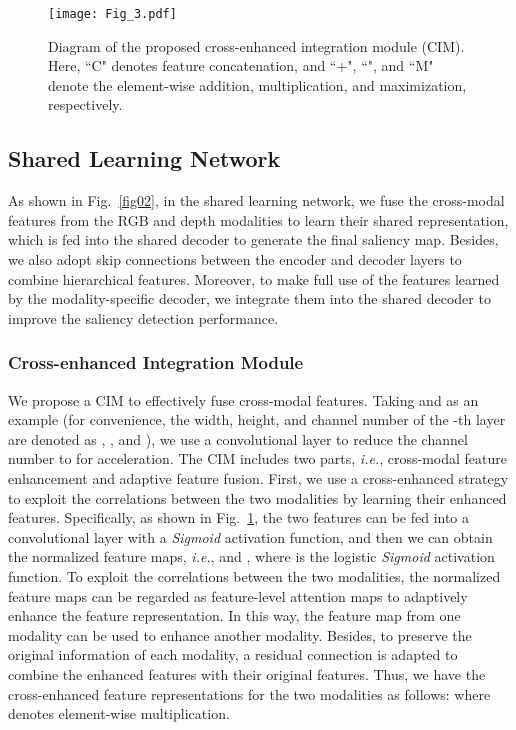 \documentclass[10pt,twocolumn,letterpaper]{article}
\def\ie{\emph{i.e.}}
\begin{document}
\begin{figure}
	\begin{centering}
		\texttt{[image: Fig\_3.pdf]}
		\caption{Diagram of the proposed cross-enhanced integration module (CIM).
		Here, ``C" denotes feature concatenation, and ``+", ``", and ``M" denote the element-wise addition, multiplication, and maximization, respectively.
		}
		\label{fig03}
	\end{centering}
\end{figure}


\subsection{Shared Learning Network}
\label{sec3.3}

As shown in Fig.~\ref{fig02}, in the shared learning network, we fuse the cross-modal features from the RGB and depth modalities to learn their shared representation, which is fed into the shared decoder to generate the final saliency map. Besides, we also adopt skip connections between the encoder and decoder layers to combine hierarchical features. Moreover, to make full use of the features learned by the modality-specific decoder, we integrate them into the shared decoder to improve the saliency detection performance.


\subsubsection{Cross-enhanced Integration Module}
\label{CIM}

We propose a CIM to effectively fuse cross-modal features. Taking  and  as an example (for convenience, the width, height, and channel number of the -th layer are denoted as , , and ),
we use a  convolutional layer to reduce the channel number to  for acceleration. The CIM includes two parts, \ie, cross-modal feature enhancement and adaptive feature fusion. First, we use a cross-enhanced strategy to exploit the correlations between the two modalities by learning their enhanced features. Specifically, as shown in Fig.~\ref{fig03}, the two features can be fed into a  convolutional layer with a \emph{Sigmoid} activation function, and then we can obtain the normalized feature maps, \ie,
 and ,
where  is the logistic \emph{Sigmoid} activation function. To exploit the correlations between the two modalities, the normalized feature maps can be regarded as feature-level attention maps to adaptively enhance the feature representation. In this way, the feature map from one modality can be used to enhance another modality. Besides, to preserve the original information of each modality, a residual connection is adapted to combine the enhanced features with their original features. Thus, we have the cross-enhanced feature representations for the two modalities as follows: 
where  denotes element-wise multiplication.
\end{document}
